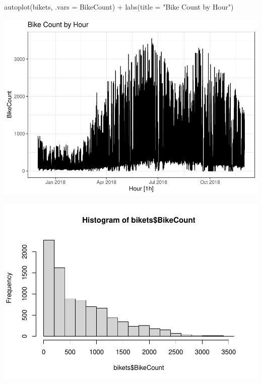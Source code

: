 \documentclass[
]{article}
\newenvironment{Shaded}{\begin{snugshade}}{\end{snugshade}}
\newcommand{\AttributeTok}[1]{\textcolor[rgb]{0.77,0.63,0.00}{#1}}
\newcommand{\FunctionTok}[1]{\textcolor[rgb]{0.00,0.00,0.00}{#1}}
\newcommand{\NormalTok}[1]{#1}
\newcommand{\SpecialCharTok}[1]{\textcolor[rgb]{0.00,0.00,0.00}{#1}}
\newcommand{\StringTok}[1]{\textcolor[rgb]{0.31,0.60,0.02}{#1}}
\begin{document}
\begin{Shaded}
\begin{Highlighting}[]
\FunctionTok{autoplot}\NormalTok{(bikets, }\AttributeTok{.vars =}\NormalTok{ BikeCount) }\SpecialCharTok{+} \FunctionTok{labs}\NormalTok{(}\AttributeTok{title =} \StringTok{"Bike Count by Hour"}\NormalTok{)}
\end{Highlighting}
\end{Shaded}

\includegraphics{BikeProject_files/figure-latex/ts-plots-1.pdf}

\begin{Shaded}
\end{Shaded}

\includegraphics{BikeProject_files/figure-latex/ts-plots-2.pdf}
\end{document}

